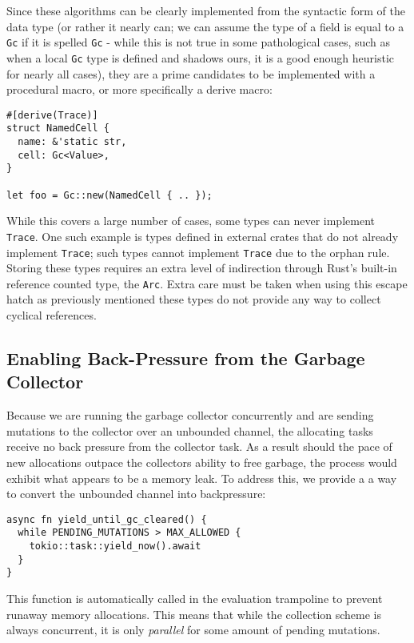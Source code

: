 \documentclass[sigplan,review,anonymous]{acmart}
\begin{document}
Since these algorithms can be clearly implemented from the syntactic form of the
data type (or rather it nearly can; we can assume the type of a field is equal to
a \texttt{Gc} if it is spelled \texttt{Gc} - while this is not true in some
pathological cases, such as when a local \texttt{Gc} type is defined and shadows
ours, it is a good enough heuristic for nearly all cases), they are a prime
candidates to be implemented with a procedural macro, or more specifically a
derive macro\cite{derive}:

\begin{verbatim}
#[derive(Trace)]
struct NamedCell {
  name: &'static str,
  cell: Gc<Value>,
}

let foo = Gc::new(NamedCell { .. });
\end{verbatim}

While this covers a large number of cases, some types can never implement
\texttt{Trace}. One such example is types defined in external crates that do not
already implement \texttt{Trace}; such types cannot implement \texttt{Trace} due
to the orphan rule\cite{orphan}. Storing these types requires an extra level of
indirection through Rust's built-in reference counted type, the
\texttt{Arc}. Extra care must be taken when using this escape hatch as
previously mentioned these types do not provide any way to collect cyclical
references.

\subsection{Enabling Back-Pressure from the Garbage Collector}

Because we are running the garbage collector concurrently and are sending
mutations to the collector over an unbounded channel, the allocating tasks
receive no back pressure from the collector task. As a result should the pace
of new allocations outpace the collectors ability to free garbage, the process
would exhibit what appears to be a memory leak. To address this, we provide a
a way to convert the unbounded channel into backpressure:

\begin{verbatim}
async fn yield_until_gc_cleared() {
  while PENDING_MUTATIONS > MAX_ALLOWED {
    tokio::task::yield_now().await
  }
}
\end{verbatim}

This function is automatically called in the evaluation trampoline to prevent
runaway memory allocations. This means that while the collection scheme is
always concurrent, it is only \textit{parallel} for some amount of pending
mutations.
\end{document}
